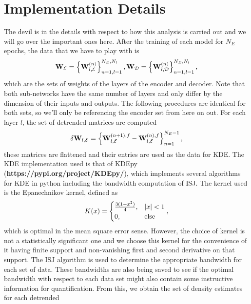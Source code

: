 \section{Implementation Details}
The devil is in the details with respect to how this analysis is carried out and we will
go over the important ones here. After the training of each model for $N_E$ epochs, the 
data that we have to play with is 
\begin{equation}
    {\bf W}_\mathcal{E} = \left\{{\bf W}_{l,\mathcal{E}}^{(n)}\right\}_{n=1, l=1}^{N_E, N_l}, 
    {\bf W}_\mathcal{D} = \left\{{\bf W}_{l,\mathcal{D}}^{(n)}\right\}_{n=1, l=1}^{N_E, N_l}, 
\end{equation}
which are the sets of weights of the layers of the encoder and decoder. Note that both sub-networks 
have the same number of layers and only differ by the dimension of their inputs and outputs.
The following procedures are identical for both sets, so we'll only be referencing the encoder set
from here on out. For each layer $l$, the set of detrended matrices are computed
\begin{equation}
    \delta{\bf W}_{l, \mathcal{E}} = \left\{{\bf W}_{l,\mathcal{E}}^{(n+1),f} - {\bf W}_{l,\mathcal{E}}^{(n),f}\right\}_{n=1}^{N_E-1},
\end{equation}
these matrices are flattened and their entries are used as the data for KDE. The KDE implementation
used is that of KDEpy ({\bf https://pypi.org/project/KDEpy/}), which implements several 
algorithms for KDE in python including the bandwidth computation of ISJ. The kernel used is the Epanechnikov
kernel, defined as 
\begin{equation}
    K(x) = 
    \begin{cases}
        \frac{3(1-x^2)}{4}, & \left|x\right| < 1 \\
        0, & \text{else}
    \end{cases},\label{eqn:epanechnikov}
\end{equation}
which is optimal in the mean square error sense. However, the choice of kernel is not a statistically 
significant one\cite{epanechnikov} and we choose this kernel for the convenience of it having finite 
support and non-vanishing first and second derivative on that support. The ISJ algorithm is used to 
determine the appropriate bandwidth for each set of data. These bandwidths are also being saved to 
see if the optimal bandwidth with respect to each data set might also contain some instructive 
information for quantification. From this, we obtain the set of density estimates for each detrended 
